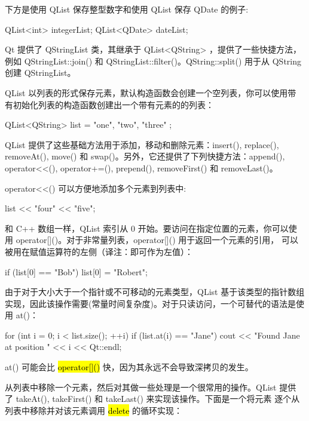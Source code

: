 下方是使用 QList 保存整型数字和使用 QList 保存 QDate 的例子:


\begin{cppcode}
QList<int> integerList;
QList<QDate> dateList;
\end{cppcode}

Qt 提供了 QStringList 类，其继承于 QList<QString> ，提供了一些快捷方法，例如 QStringList::join() 和 QStringList::filter()。QString::split() 用于从 QString 创建 QStringList。

QList 以列表的形式保存元素，默认构造函数会创建一个空列表，你可以使用带
有初始化列表的构造函数创建出一个带有元素的的列表：

\begin{cppcode}
QList<QString> list = { "one", "two", "three" };
\end{cppcode}

QList 提供了这些基础方法用于添加，移动和删除元素：insert(), replace(), removeAt(), move() 和 swap()。另外，它还提供了下列快捷方法：append(), operator<<(), operator+=(), prepend(), removeFirst() 和 removeLast()。

operator<<() 可以方便地添加多个元素到列表中:

\begin{cppcode}
list << "four" << "five";
\end{cppcode}

和 C++ 数组一样，QList 索引从 0 开始。要访问在指定位置的元素，你可以使
用 operator[]()。对于非常量列表，operator[]() 用于返回一个元素的引用，
可以被用在赋值运算符的左侧（译注：即可作为左值）：

\begin{cppcode}
if (list[0] == "Bob")
    list[0] = "Robert";
\end{cppcode}

由于对于大小大于一个指针或不可移动的元素类型，QList 基于该类型的指针数组实现，因此该操作需要(常量时间复杂度)。对于只读访问，一个可替代的语法是使用 at()：

\begin{cppcode}
for (int i = 0; i < list.size(); ++i) {
    if (list.at(i) == "Jane")
        cout << "Found Jane at position " << i << Qt::endl;
}
\end{cppcode}

at() 可能会比 \hl{operator[]()} 快，因为其永远不会导致深拷贝的发生。

从列表中移除一个元素，然后对其做一些处理是一个很常用的操作。QList 提供
了 takeAt(), takeFirst() 和 takeLast() 来实现该操作。下面是一个将元素
逐个从列表中移除并对该元素调用 \hl{delete} 的循环实现：

